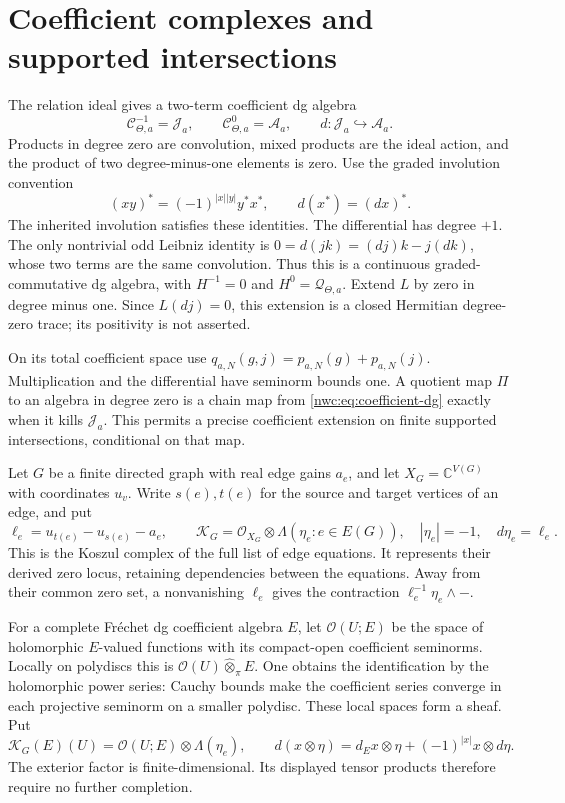 \section{Coefficient complexes and supported intersections}

The relation ideal gives a two-term coefficient dg algebra
\begin{equation}\label{nwc:eq:coefficient-dg}
 \mathcal C_{\Theta,a}^{-1}=\mathcal J_a,
 \qquad \mathcal C_{\Theta,a}^0=\mathcal A_a,
 \qquad d:\mathcal J_a\hookrightarrow\mathcal A_a.
\end{equation}
Products in degree zero are convolution, mixed products are the ideal
action, and the product of two degree-minus-one elements is zero.
Use the graded involution convention
\[
 (xy)^*=(-1)^{|x||y|}y^*x^*,\qquad d(x^*)=(dx)^*.
\]
The inherited involution satisfies these identities.
The differential has degree $+1$.
The only nontrivial odd Leibniz identity is
$0=d(jk)=(dj)k-j(dk)$, whose two terms are the same convolution.
Thus this is a continuous graded-commutative dg algebra, with
$H^{-1}=0$ and $H^0=\mathcal Q_{\Theta,a}$.
Extend $L$ by zero in degree minus one. Since $L(dj)=0$, this
extension is a closed Hermitian degree-zero trace; its positivity
is not asserted.

On its total coefficient space use
$q_{a,N}(g,j)=p_{a,N}(g)+p_{a,N}(j)$.
Multiplication and the differential have seminorm bounds one.
A quotient map $\Pi$ to an algebra in degree zero is a chain map
from \eqref{nwc:eq:coefficient-dg} exactly when it kills
$\mathcal J_a$.
This permits a precise coefficient extension on finite supported
intersections, conditional on that map.

Let $G$ be a finite directed graph with real edge gains $a_e$,
and let $X_G=\mathbb C^{V(G)}$ with coordinates $u_v$.
Write $s(e),t(e)$ for the source and target vertices of an edge, and put
\[
 \ell_e=u_{t(e)}-u_{s(e)}-a_e,
 \qquad
 \mathcal K_G=\mathcal O_{X_G}\otimes
              \Lambda(\eta_e:e\in E(G)),
 \quad |\eta_e|=-1,
 \quad d\eta_e=\ell_e.
\]
This is the Koszul complex of the full list of edge equations.
It represents their derived zero locus, retaining dependencies
between the equations. Away from their common zero set, a nonvanishing
$\ell_e$ gives the contraction $\ell_e^{-1}\eta_e\wedge-$.

For a complete Fr\'echet dg coefficient algebra $E$, let
$\mathcal O(U;E)$ be the space of holomorphic $E$-valued functions
with its compact-open coefficient seminorms. Locally on polydiscs
this is $\mathcal O(U)\widehat\otimes_\pi E$.
One obtains the identification by the holomorphic power series:
Cauchy bounds make the coefficient series converge in each projective
seminorm on a smaller polydisc. These local spaces form a sheaf.
Put
\[
 \mathcal K_G(E)(U)=\mathcal O(U;E)\otimes\Lambda(\eta_e),
 \qquad
 d(x\otimes\eta)=d_Ex\otimes\eta+(-1)^{|x|}x\otimes d\eta.
\]
The exterior factor is finite-dimensional. Its displayed tensor
products therefore require no further completion.

